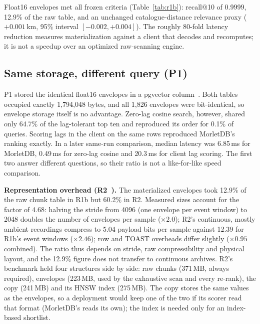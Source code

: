 \documentclass[sigconf,nonacm]{acmart}
\newcommand{\M}{MorletDB}
\begin{document}
Float16 envelopes met all frozen criteria (Table~\ref{tab:r1b}): recall@10 of 0.9999, 12.9\% of the raw table, and an unchanged catalogue-distance relevance proxy ($+0.001$\,km, 95\% interval $[-0.002, +0.004]$). The roughly 80-fold latency reduction measures materialization against a client that decodes and recomputes; it is not a speedup over an optimized raw-scanning engine.

\subsection{Same storage, different query (P1)}
P1 stored the identical float16 envelopes in a pgvector  column~\cite{pgvector}. Both tables occupied exactly 1,794,048 bytes, and all 1,826 envelopes were bit-identical, so envelope storage itself is no advantage. Zero-lag cosine search, however, shared only 64.7\% of the lag-tolerant top ten and reproduced its order for 0.1\% of queries. Scoring lags in the client on the same  rows reproduced \M{}'s ranking exactly. In a later same-run comparison, median latency was 6.85\,ms for \M{}, 0.49\,ms for zero-lag cosine and 20.3\,ms for client lag scoring. The first two answer different questions, so their ratio is not a like-for-like speed comparison.

\textbf{Representation overhead (R2~\cite{r2}).} The materialized envelopes took 12.9\% of the raw chunk table in R1b but 60.2\% in R2. Measured sizes account for the factor of 4.68: halving the stride from 4096 (one envelope per event window) to 2048 doubles the number of envelopes per sample ($\times2.0$); R2's continuous, mostly ambient recordings compress to 5.04 payload bits per sample against 12.39 for R1b's event windows ($\times2.46$); row and TOAST overheads differ slightly ($\times0.95$ combined). The ratio thus depends on stride, raw compressibility and physical layout, and the 12.9\% figure does not transfer to continuous archives. R2's benchmark held four structures side by side: raw chunks (371\,MB, always required), envelopes (223\,MB, used by the exhaustive scan and every re-rank), the  copy (241\,MB) and its HNSW index (275\,MB). The copy stores the same values as the envelopes, so a deployment would keep one of the two if its scorer read that format (\M{}'s reads its own); the index is needed only for an index-based shortlist.
\end{document}
